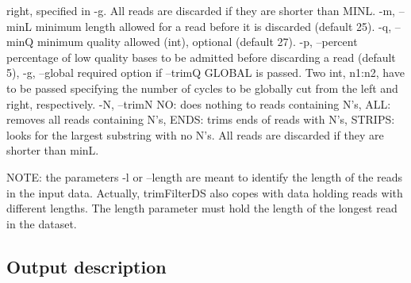\begin{DoxyCode}
                         right, specified in -g.
               All reads are discarded if they are shorter than MINL.
 -m, --minL    minimum length allowed for a read before it is discarded
               (default 25).
 -q, --minQ    minimum quality allowed (int), optional (default 27).
 -p, --percent percentage of low quality bases to be admitted before
               discarding a read (default 5),
 -g, --global  required option if --trimQ GLOBAL is passed. Two int,
               n1:n2, have to be passed specifying the number of cycles
               to be globally cut from the left and right, respectively.
 -N, --trimN   NO:     does nothing to reads containing N's,
               ALL:    removes all reads containing N's,
               ENDS:   trims ends of reads with N's,
               STRIPS: looks for the largest substring with no N's.
               All reads are discarded if they are shorter than minL.
\end{DoxyCode}


N\+O\+TE\+: the parameters -\/l or --length are meant to identify the length of the reads in the input data. Actually, {\ttfamily trim\+Filter\+DS} also copes with data holding reads with different lengths. The length parameter must hold the length of the longest read in the dataset.

\subsection*{Output description}


